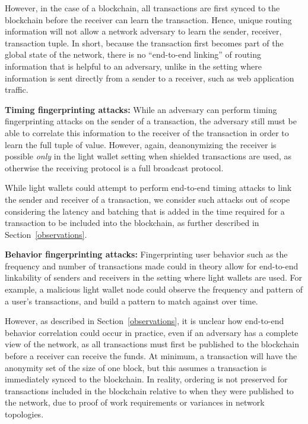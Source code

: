 \documentclass{article}
\begin{document}
However, in the case of a blockchain, all transactions are first synced to the
blockchain before the receiver can learn the transaction. Hence, unique routing
information will not allow a network adversary to learn the sender, receiver,
transaction tuple. In short, because the transaction first becomes part of the
global state of the network, there is no ``end-to-end linking'' of routing
information that is helpful to an adversary, unlike in the setting where
information is sent directly from a sender to a receiver, such as web
application traffic.

\textbf{Timing fingerprinting attacks:}
While an adversary can perform timing fingerprinting attacks on the sender of a
transaction, the adversary still must be able to correlate this information to
the receiver of the transaction in order to learn the full tuple of value.
However, again, deanonymizing the receiver is possible
\emph{only} in the light wallet setting when shielded transactions are used, as
otherwise the receiving protocol is a full broadcast protocol.

While light wallets could attempt to perform end-to-end timing attacks to link
the sender and receiver of a transaction, we
consider such attacks out of scope considering the latency and batching that is
added in the time required for a transaction to be included into the
blockchain, as further described in Section~\ref{observations}.

\textbf{Behavior fingerprinting attacks:}
Fingerprinting user behavior such as the frequency and number of transactions
made could in theory allow for end-to-end linkability of senders and receivers
in the setting where light wallets are used.
For example, a malicious light wallet node could observe
the frequency and pattern of a user’s transactions, and build a pattern to
match against over time.

However, as described in Section~\ref{observations}, it is unclear how
end-to-end behavior correlation could occur in practice, even if an adversary has a
complete view of the network, as all transactions must first be
published to the blockchain before a receiver can receive the funds. At minimum, a
transaction will have the anonymity set of the size of one block, but this
assumes a transaction is immediately synced to the blockchain. In reality,
ordering is not preserved for transactions included in the blockchain relative
to when they were published to the network, due to proof of work
requirements or variances in network topologies.
\end{document}
